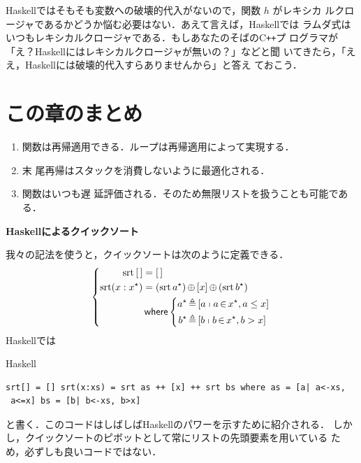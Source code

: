 \documentclass[a5paper,twoside,fleqn]{jsbook}
\newcommand{\programminglanguage}[1]{\textsf{#1}}
\newcommand{\cxx}{\programminglanguage{C}\texttt{++}}
\newcommand{\haskell}{\programminglanguage{Haskell}}
\newenvironment{note}[1]{\begin{boxnote}\begin{center}\textbf{#1}\end{center}}{\end{boxnote}}
\newenvironment{haskellcode}{\begin{itembox}[r]{\haskell}}{\end{itembox}}
\newcommand{\mKeyword}[1]{\mathsf{#1}} %
\newcommand{\mWhereKeyword}{\mKeyword{where}}
\DeclareMathOperator{\mWhere}{\mWhereKeyword}
\newcommand{\mEmptyList}{{[\,]}}
\newcommand{\mSpecialFunc}[1]{\mathrm{#1}}
\DeclareMathOperator{\mSort}{\mSpecialFunc{srt}}
\DeclareMathOperator{\mAppend}{\oplus}
\DeclareMathOperator{\mFrom}{\in}
\DeclareMathOperator{\mLetEq}{\triangleq}
\newcommand{\mListWith}[1]{\left[#1\right]}
\newcommand{\mList}[1]{{#1}^\mathrm{\star}}
\newcommand{\mListComp}[1]{\shortmid#1}
\begin{document}
\haskell ではそもそも変数への破壊的代入がないので，関数 $h$ がレキシカ
ルクロージャであるかどうか悩む必要はない．あえて言えば，\haskell では
ラムダ式はいつもレキシカルクロージャである．もしあなたのそばの\cxx プ
ログラマが「え？\haskell にはレキシカルクロージャが無いの？」などと聞
いてきたら，「ええ，\haskell には破壊的代入すらありませんから」と答え
ておこう．






\section{この章のまとめ}

\begin{enumerate}
\item 関数は再帰適用できる．ループは再帰適用によって実現する．\item 末
  尾再帰はスタックを消費しないように最適化される．\item 関数はいつも遅
  延評価される．そのため無限リストを扱うことも可能である．
\end{enumerate}

\begin{note}{\haskell によるクイックソート}
我々の記法を使うと，クイックソートは次のように定義できる．
\begin{equation*}
\left\{
\begin{aligned}
\mSort\mEmptyList &=\mEmptyList\\ \mSort(x:\mList{x})
&=(\mSort\mList{a})\mAppend\mListWith{x}\mAppend{}(\mSort\mList{b})\\ &\mWhere
\left\{
\begin{aligned}
\mList{a}&\mLetEq\mListWith{a\mListComp{a\mFrom\mList{x},a\le
    x}}\\ \mList{b}&\mLetEq\mListWith{b\mListComp{b\mFrom\mList{x},b>x}}
\end{aligned}
\right.
\end{aligned}
\right.
\end{equation*}
\haskell では %
\begin{haskellcode}
\begin{verbatim}
srt[] = [] srt(x:xs) = srt as ++ [x] ++ srt bs where as = [a| a<-xs,
 a<=x] bs = [b| b<-xs, b>x]
\end{verbatim}
\end{haskellcode}
と書く．このコードはしばしば\haskell のパワーを示すために紹介される．
しかし，クイックソートのピボットとして常にリストの先頭要素を用いている
ため，必ずしも良いコードではない．
\end{note}
\end{document}
